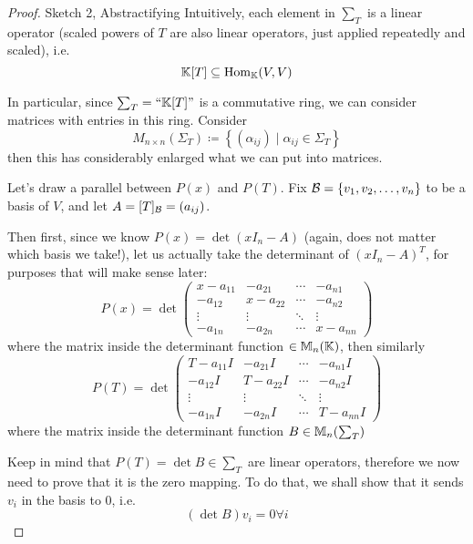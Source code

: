 \begin{proof} {Sketch 2, Abstractifying}
    Intuitively, each element in \(\sum_T\) is a linear operator (scaled powers of \(T\) are also linear operators, just applied repeatedly and scaled), i.e. \[
        \mathbb{K}[T] \subseteq \mathrm{Hom}_{\mathbb{K}}(V, V)
    \]

    In particular, since \(\sum_T = ``\mathbb{K}[T]"\) is a commutative ring, we can consider matrices with entries in this ring. Consider \[
        M_{n \times n}\left(\Sigma_T\right) \coloneqq \left\{ (\alpha_{ij}) \mid \alpha_{ij} \in \Sigma_T\right\}
    \]
    then this has considerably enlarged what we can put into matrices.

    Let's draw a parallel between \(P(x)\) and \(P(T)\). Fix \(\mathcal{B} = \{v_1, v_2, \dots, v_n\}\) to be a basis of \(V\), and let \(A = [T]_{\mathcal{B}} = (a_{ij})\).

    Then first, since we know \(P(x) = \det(xI_n - A)\) (again, does not matter which basis we take!), let us actually take the determinant of \((xI_n - A)^T\), for purposes that will make sense later:
    \[
        P(x) = \det \begin{pmatrix}
            x - a_{11} & -a_{21}    & \cdots & -a_{n1}  \\
            -a_{12}    & x - a_{22} & \cdots & -a_{n2}  \\
            \vdots     & \vdots     & \ddots & \vdots   \\
            -a_{1n}    & -a_{2n}    & \cdots & x-a_{nn}
        \end{pmatrix}
    \]
    where the matrix inside the determinant function \(\in \mathbb{M}_n(\mathbb{K})\), then similarly \[
        P(T) = \det \begin{pmatrix}
            T - a_{11}I & -a_{21}I    & \cdots & -a_{n1}I  \\
            -a_{12}I    & T - a_{22}I & \cdots & -a_{n2}I  \\
            \vdots      & \vdots      & \ddots & \vdots    \\
            -a_{1n}I    & -a_{2n}I    & \cdots & T-a_{nn}I
        \end{pmatrix}
    \]
    where the matrix inside the determinant function \( B \in \mathbb{M}_n(\sum_T)\)

    Keep in mind that \(P(T) = \det B \in \sum_T\) are linear operators, therefore we now need to prove that it is the zero mapping. To do that, we shall show that it sends \(v_i\) in the basis to 0, i.e. \[
        (\det B) v_i = 0 \forall i
    \]


\end{proof}
